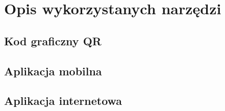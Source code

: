 \section{Opis wykorzystanych narzędzi}
\subsection{Kod graficzny QR}
\subsection{Aplikacja mobilna}
\subsection{Aplikacja internetowa}
